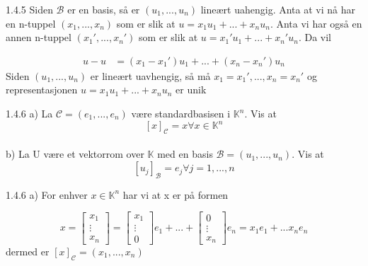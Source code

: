 \documentclass[a4paper,norsk]{article}
\begin{document}
\begin{proofbox}{1.4.5}{}
Siden $ \mathcal{B} $ er en basis, så er $ \left( u_1, ..., u_n \right)  $  lineært uahengig. Anta at vi nå har en n-tuppel $ \left( x_1, ..., x_n \right)  $ som er slik at $ u = x_1 u_1 + ... + x_n u_n $. Anta vi har også en annen n-tuppel $ \left( x_1', ..., x_n' \right)  $  som er slik at $ u = x_1' u_1 + ... + x_n' u_n $. Da vil

\begin{align*}
    u - u &= \left( x_1 - x_1' \right) u_1 + ... + \left( x_n - x_n' \right) u_n 
\end{align*}
Siden $ \left( u_1, ..., u_n \right)  $ er lineært uavhengig, så må $ x_1=x_1', ..., x_n = x_n' $ og representasjonen $ u = x_1 u_1 + ... + x_n u_n $ er unik
\end{proofbox}

\begin{oppgavebox}{1.4.6}{}
a) La $ \mathcal{C} = \left( e_1, ..., e_n \right) $ være standardbasisen i $ \mathbb{K}^n $. Vis at
\[
    \left[ x \right] _{\mathcal{C}} = x \forall x \in \mathbb{K}^n
\]\\


b) La U være et vektorrom over $ \mathbb{K} $ med en basis $ \mathcal{B} = \left( u_1, ..., u_n \right)  $. Vis at 
\[
    \left[ u_j \right] _{\mathcal{B} } = e_j \forall j=1, ..., n
\]    
\end{oppgavebox}


\begin{proofbox}{1.4.6 a)}{}
For enhver $ x \in \mathbb{K}^n $ har vi at x er på formen


\[
    x = \begin{bmatrix}
        x_1 \\
        \vdots\\
        x_n
    \end{bmatrix} 
    = \begin{bmatrix}
        x_1 \\
        \vdots\\
        0
    \end{bmatrix} e_1 + ... + \begin{bmatrix}
        0 \\
        \vdots\\
        x_n
    \end{bmatrix} e_n = x_1 e_1 + ... x_n e_n 
\]
dermed er $ \left[ x \right] _{\mathcal{C}} = \left( x_1, ..., x_n \right) $ 
\end{proofbox}
\end{document}
